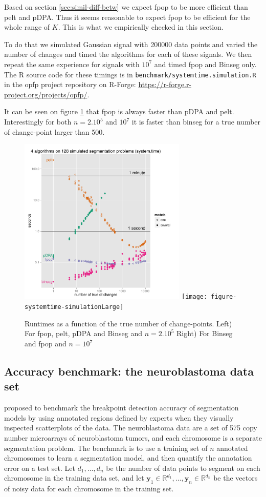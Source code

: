 \documentclass{article}
\newcommand{\RR}{\mathbb R}
\begin{document}
Based on section \ref{sec:simil-diff-betw} we expect fpop to be more efficient than pelt and pDPA.
Thus it seems reasonable to expect fpop to be efficient for the whole range of $K$. 
This is what we empirically checked in this section.

To do that we simulated Gaussian signal with 200000 data points and varied the number of changes
and timed the algorithms for each of these signals. We then repeat the same experience for signals with $10^7$ and timed fpop and Binseg only.
The R source code
for these timings is in \verb|benchmark/systemtime.simulation.R| in
the opfp project repository on R-Forge: \url{https://r-forge.r-project.org/projects/opfp/}.

It can be seen on figure \ref{fig:simu_numberK} that fpop is always faster than pDPA and pelt. 
Interestingly for both $n=2.10^5$ and $10^7$ it is faster than binseg for a true number of change-point larger than 500.

\begin{figure}\label{fig:simu_numberK}
  \includegraphics[width=8cm]{figure-systemtime-simulation}
    \texttt{[image: figure-systemtime-simulationLarge]}
\caption{Runtimes as a function of the true number of change-points.
Left) For fpop, pelt,
pDPA and Binseg and $n=2. 10^5$
Right) For Binseg and fpop and $n=10^7$
}
\end{figure}



\subsection{Accuracy benchmark: the neuroblastoma data set}

\citet{HOCKING-breakpoints} proposed to benchmark the breakpoint
detection accuracy of segmentation models by using annotated regions
defined by experts when they visually inspected scatterplots of the
data. The neuroblastoma data are a set of 575 copy number microarrays
of neuroblastoma tumors, and each chromosome is a separate
segmentation problem. The benchmark is to use a training set of $n$
annotated chromosomes to learn a segmentation model, and then quantify
the annotation error on a test set. Let $d_1, \dots, d_n$ be the
number of data points to segment on each chromosome in the training
data set, and let $\mathbf y_1\in\RR^{d_1}, \dots, \mathbf
y_n\in\RR^{d_n}$ be the vectors of noisy data for each chromosome in
the training set.
\end{document}
